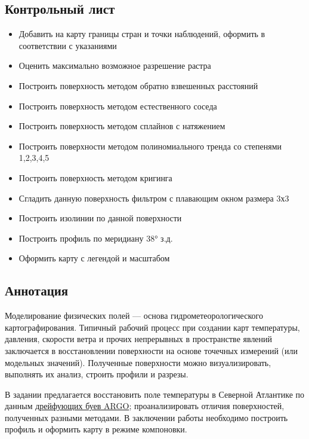 \documentclass[]{book}
\providecommand{\tightlist}{%
  \setlength{\itemsep}{0pt}\setlength{\parskip}{0pt}}
\theoremstyle{definition}
\theoremstyle{definition}
\theoremstyle{definition}
\theoremstyle{remark}
\begin{document}
\hypertarget{interpolation-control}{%
\subsection{Контрольный лист}\label{interpolation-control}}

\begin{itemize}
\tightlist
\item
  Добавить на карту границы стран и точки наблюдений, оформить в
  соответствии с указаниями
\item
  Оценить максимально возможное разрешение растра
\item
  Построить поверхность методом обратно взвешенных расстояний
\item
  Построить поверхность методом естественного соседа
\item
  Построить поверхность методом сплайнов с натяжением
\item
  Построить поверхности методом полиномиального тренда со степенями
  1,2,3,4,5
\item
  Построить поверхность методом кригинга
\item
  Сгладить данную поверхность фильтром с плавающим окном размера 3х3
\item
  Построить изолинии по данной поверхности
\item
  Построить профиль по меридиану 38° з.д.
\item
  Оформить карту с легендой и масштабом
\end{itemize}

\hypertarget{interpolation-annotation}{%
\subsection{Аннотация}\label{interpolation-annotation}}

Моделирование физических полей --- основа гидрометеорологического
картографирования. Типичный рабочий процесс при создании карт
температуры, давления, скорости ветра и прочих непрерывных в
пространстве явлений заключается в восстановлении поверхности на основе
точечных измерений (или модельных значений). Полученные поверхности
можно визуализировать, выполнять их анализ, строить профили и разрезы.

В задании предлагается восстановить поле температуры в Северной
Атлантике по данным \href{http://www.argo.ucsd.edu}{дрейфующих буев
ARGO}; проанализировать отличия поверхностей, полученных разными
методами. В заключении работы необходимо построить профиль и оформить
карту в режиме компоновки.
\end{document}
